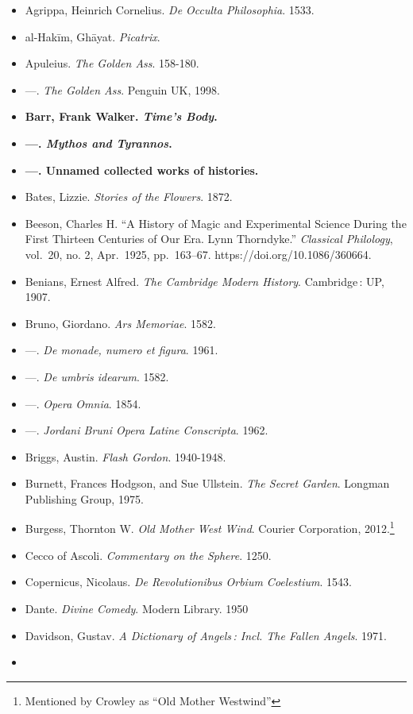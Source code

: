 \documentclass[12pt]{article}
\providecommand{\tightlist}{%
  \setlength{\itemsep}{0pt}\setlength{\parskip}{0pt}}
\begin{document}
\begin{itemize}
\tightlist
\item
  Agrippa, Heinrich Cornelius. \emph{De Occulta Philosophia}. 1533.
\item
  al-Hakīm, Ghāyat. \emph{Picatrix}.
\item
  Apuleius. \emph{The Golden Ass}. 158-180.
\item
  \! ---. \emph{The Golden Ass}. Penguin UK, 1998.
\item
  \textbf{Barr, Frank Walker. \emph{Time's Body}.}
\item
  \textbf{---. \emph{Mythos and Tyrannos}.}
\item
  \textbf{---. Unnamed collected works of histories.}
\item
  Bates, Lizzie. \emph{Stories of the Flowers}. 1872.
\item
  Beeson, Charles H. ``A History of Magic and Experimental Science During the First Thirteen Centuries of Our Era. Lynn Thorndyke.'' \emph{Classical Philology}, vol.~20, no. 2, Apr.~1925, pp.~163--67. https://doi.org/10.1086/360664.
\item
  Benians, Ernest Alfred. \emph{The Cambridge Modern History}. Cambridge\,: UP, 1907.
\item
  Bruno, Giordano. \emph{Ars Memoriae}. 1582.
\item
  \! ---. \emph{De monade, numero et figura}. 1961.
\item
  \! ---. \emph{De umbris idearum}. 1582.
\item
  \! ---. \emph{Opera Omnia}. 1854.
\item
  \! ---. \emph{Jordani Bruni Opera Latine Conscripta}. 1962.
\item
  Briggs, Austin. \emph{Flash Gordon}. 1940-1948.
\item
  Burnett, Frances Hodgson, and Sue Ullstein. \emph{The Secret Garden}. Longman Publishing Group, 1975.
\item
  Burgess, Thornton W. \emph{Old Mother West Wind}. Courier Corporation, 2012.\footnote{Mentioned by Crowley as ``Old Mother Westwind''}
\item
  Cecco of Ascoli. \emph{Commentary on the Sphere}. 1250.
\item
  Copernicus, Nicolaus. \emph{De Revolutionibus Orbium Coelestium}. 1543.
\item
  Dante. \emph{Divine Comedy}. Modern Library. 1950
\item
  Davidson, Gustav. \emph{A Dictionary of Angels\,: Incl. The Fallen Angels}. 1971.
\item

\end{itemize}
\end{document}

